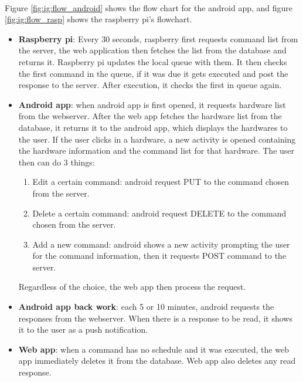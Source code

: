 \documentclass[12pt, oneside, a4paper]{book}
\newcommand\boldcolor[1]{\textcolor{bold}{\textbf{#1}}}
\begin{document}
				\paragraph{} Figure \ref{fig:ig:flow_android} shows the flow chart for the android app, and figure \ref{fig:ig:flow_rasp} shows the raspberry pi's flowchart.
				\begin{itemize}
					\item \boldcolor{Raspberry pi}: Every 30 seconds, raspberry first requests command list from the server, the web application then fetches the list from the database and returns it. Raspberry pi updates the local queue with them. It then checks the first command in the queue, if it was due it gets executed and post the response to the server. After execution,  it checks the first in queue again.
					\item \boldcolor{Android app}: when android app is first opened, it requests hardware list from the webserver. After the web app fetches the hardware list from the database, it returns it to the android app, which displays the hardwares to the user. If the user clicks in a hardware, a new activity is opened containing the hardware information and the command list for that hardware. The user then can do 3 things: 
					\begin{enumerate}
						\item Edit a certain command: android request PUT to the command chosen from the server.
						\item Delete a certain command: android request DELETE to the command chosen from the server.
						\item Add a new command: android shows a new activity prompting the user for the command information, then it requests POST command to the server. 
					\end{enumerate}
					Regardless of the choice, the web app then process the request.
					\item \boldcolor{Android app back work}: each 5 or 10 minutes, android requests the responses from the webserver. When there is a response to be read, it shows it to the user as a push notification.
					\item \boldcolor{Web app}: when a command has no schedule and it was executed, the web app immediately deletes it from the database. Web app also deletes any read response.
				\end{itemize}
\end{document}
